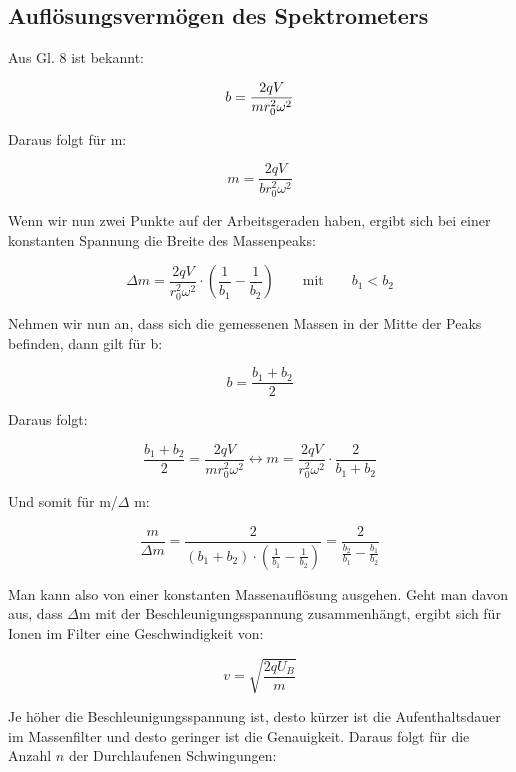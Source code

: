 \newpage
\subsection{Auflösungsvermögen des Spektrometers}
Aus Gl. 8 ist bekannt:

\begin{equation}
\notag
b = \frac{2qV}{mr_{0}^{2}\omega^{2}}
\end{equation}

Daraus folgt für m:

\begin{equation}
m = \frac{2qV}{br_{0}^{2}\omega^{2}}
\end{equation}

Wenn wir nun zwei Punkte auf der Arbeitsgeraden haben, ergibt sich bei einer konstanten Spannung die Breite des Massenpeaks:

\begin{equation}
\Delta m = \frac{2qV}{r_{0}^{2}\omega^{2}}\cdot \left( \frac{1}{b_1}-\frac{1}{b_2}\right) \qquad \text{mit} \qquad b_1 < b_2
\end{equation}

Nehmen wir nun an, dass sich die gemessenen Massen in der Mitte der Peaks befinden, dann gilt für b:

\begin{equation}
b = \frac{b_1 + b_2}{2}
\end{equation}

Daraus folgt:

\begin{equation}
\frac{b_1 + b_2}{2}=\frac{2qV}{mr_0^2 \omega^2} \leftrightarrow m = \frac{2qV}{r_0^2 \omega^2}\cdot \frac{2}{b_1 + b_2}
\end{equation}

Und somit für m/$\Delta$ m:

\begin{equation}
\frac{m}{\Delta m} = \frac{2}{(b_1+b_2)\cdot \left(\frac{1}{b_1}-\frac{1}{b_2}\right)} = \frac{2}{\frac{b_2}{b_1}-\frac{b_1}{b_2}}
\end{equation}

Man kann also von einer konstanten Massenauflösung ausgehen. Geht man davon aus, dass $\Delta$m mit der Beschleunigungsspannung zusammenhängt, ergibt sich für Ionen im Filter eine Geschwindigkeit von:

\begin{equation}
v=\sqrt{\frac{2qU_B}{m}}
\end{equation}

Je höher die Beschleunigungsspannung ist, desto kürzer ist die Aufenthaltsdauer im Massenfilter und desto geringer ist die Genauigkeit. Daraus folgt für die Anzahl $n$ der Durchlaufenen Schwingungen:

